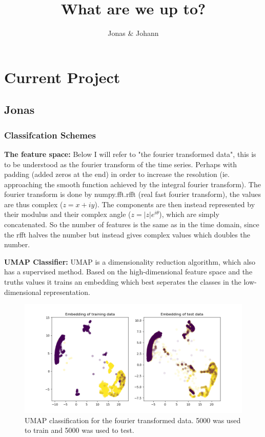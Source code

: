 \documentclass{article}
\title{What are we up to?}
\author{Jonas \& Johann}
\begin{document}
\maketitle

\section{Current Project}
\subsection{Jonas}
\subsubsection{Classifcation Schemes}
\textbf{The feature space:}
Below I will refer to "the fourier transformed data", this is to be understood as the fourier transform of the time series. Perhaps with padding (added zeros at the end) in order to increase the resolution (ie. approaching the smooth function achieved by the integral fourier transform).
The fourier transform is done by numpy.fft.rfft (real fast fourier transform), the values are thus complex ($z = x + iy$).
The components are then instead represented by their modulus and their complex angle ($z = |z|e^{i\theta}$), which are simply concatenated.
So the number of features is the same as in the time domain, since the rfft halves the number but instead gives complex values which doubles the number.

\textbf{UMAP Classifier:}
UMAP is a dimensionality reduction algorithm, which also has a supervised method. Based on the high-dimensional feature space and the truths values it trains an embedding which best seperates the classes in the low-dimensional representation.

\begin{figure}
    \centering
    \includegraphics[width=1.5\linewidth]{code_jonas/figures/UMAP_preliminary_classification.png}
    \caption{UMAP classification for the fourier transformed data. 5000 was used to train and 5000 was used to test.}
    \label{fig:UMAP_Classification}
\end{figure}
\end{document}
